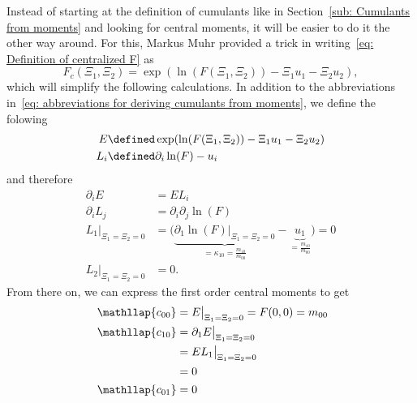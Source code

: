 Instead of starting at the definition of cumulants like in Section~\ref{sub: Cumulants from moments} and looking for central moments, it will be easier to do it the other way around.
For this, Markus Muhr provided a trick in writing~\eqref{eq: Definition of centralized F} as
\begin{equation}
  F_c(\Xi_1, \Xi_2) = \exp(\ln(F(\Xi_1,\Xi_2)) - \Xi_1 u_1 - \Xi_2 u_2),
\end{equation}
which will simplify the following calculations.
In addition to the abbreviations in~\eqref{eq: abbreviations for deriving cumulants from moments}, we define the folowing
\begin{equation}
  \label{eq: additional abbreviations}
  \begin{aligned}
    E & \defined \exp(\ln(F(\Xi_1,\Xi_2)) - \Xi_1 u_1 - \Xi_2 u_2) \\
    L_i & \defined \partial_i \ln(F) - u_i
  \end{aligned}
\end{equation}
and therefore
\begin{equation}
  \begin{aligned}
    \partial_i E & = EL_i \\
    \partial_i L_j & = \partial_i\partial_j\ln(F)\\
    L_1\bigr|_{\Xi_1=\Xi_2 = 0} & = \bigg(
      \underbrace{ \partial_1\ln(F) \bigr|_{\Xi_1=\Xi_2 = 0}}_{ = \kappa_{10} = \frac{m_{10}}{m_{00}}}
      - \underbrace{u_1}_{ = \frac{m_{10}}{m_{00}}} \bigg) = 0 \\
    L_2\bigr|_{\Xi_1=\Xi_2 = 0} & = 0.
  \end{aligned}
\end{equation}
From there on, we can express the first order central moments to get
\begin{align*}
  \phantom{c_{00}}
  &\begin{aligned}
  \nonumber
    \mathllap{c_{00}} & = E\bigr|_{\Xi_1=\Xi_2 = 0} = F(0,0) = m_{00}
  \end{aligned}\\
  &\begin{aligned}
  \nonumber
    \mathllap{c_{10}} & =  \partial_1 E  \bigr|_{\Xi_1=\Xi_2 = 0} \\
    & = EL_1  \bigr|_{\Xi_1=\Xi_2 = 0} \\
    & = 0
  \end{aligned}\\
  &\begin{aligned}
  \nonumber
    \mathllap{c_{01}} & = 0
  \end{aligned}\\
\end{align*}
